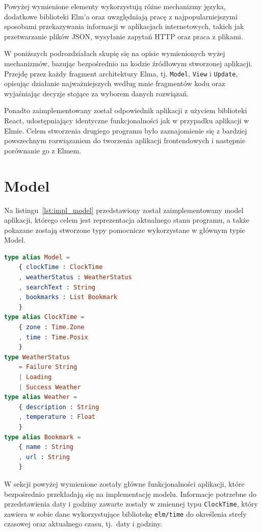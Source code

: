 \documentclass[twoside,a4paper]{report}
\begin{document}
Powyżej wymienione elementy wykorzystują różne mechanizmy języka, dodatkowe biblioteki Elm'a oraz uwzględniają pracę z najpopularniejszymi sposobami przekazywania informacji w aplikacjach internetowych, takich jak przetwarzanie plików JSON, wysyłanie zapytań HTTP oraz praca z plikami.

W poniższych podrozdziałach skupię się na opisie wymienionych wyżej mechanizmów, bazując bezpośrednio na kodzie źródłowym stworzonej aplikacji.
Przejdę przez każdy fragment architektury Elma, tj. \texttt{Model}, \texttt{View} i \texttt{Update}, opisując działanie najważniejszych według mnie fragmentów kodu oraz wyjaśniając decyzje stojące za wyborem danych rozwiązań.

Ponadto zaimplementowany został odpowiednik aplikacji z użyciem biblioteki React, udostępniający identyczne funkcjonalności jak w przypadku aplikacji w Elmie.
Celem stworzenia drugiego programu było zaznajomienie się z bardziej powszechnym rozwiązaniem do tworzenia aplikacji frontendowych i następnie porównanie go z Elmem.

\section{Model}
Na listingu~\ref{lst:impl_model} przedstawiony został zaimplementowany model aplikacji, którego celem jest reprezentacja aktualnego stanu programu, a także pokazane zostają stworzone typy pomocnicze wykorzystane w głównym typie Model.

\begin{lstlisting}[caption={\textit{}Pełen model aplikacji},label={lst:impl_model},language={Elm}]
type alias Model =
    { clockTime : ClockTime
    , weatherStatus : WeatherStatus
    , searchText : String
    , bookmarks : List Bookmark
    }
type alias ClockTime =
    { zone : Time.Zone
    , time : Time.Posix
    }
type WeatherStatus
    = Failure String
    | Loading
    | Success Weather
type alias Weather =
    { description : String
    , temperature : Float
    }
type alias Bookmark =
    { name : String
    , url : String
    }
\end{lstlisting}

W sekcji powyżej wymienione zostały główne funkcjonalności aplikacji, które bezpośrednio przekładają się na implementację modelu.
Informacje potrzebne do przedstawienia daty i godziny zawarte zostały w zmiennej typu \texttt{ClockTime}, który zawiera w sobie dane wykorzystujące bibliotekę \texttt{elm/time} do określenia strefy czasowej oraz aktualnego czasu, tj.~daty i godziny.
\end{document}
